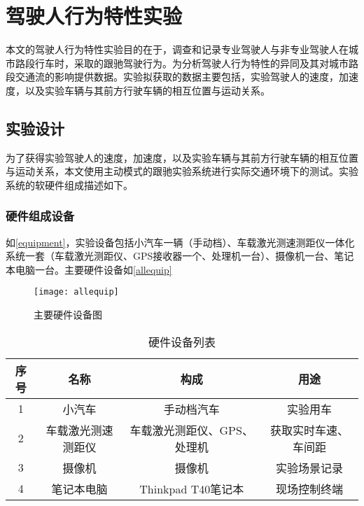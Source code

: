 \chapter{驾驶人行为特性实验}



本文的驾驶人行为特性实验目的在于，调查和记录专业驾驶人与非专业驾驶人在城市路段行车时，采取的跟驰驾驶行为。为分析驾驶人行为特性的异同及其对城市路段交通流的影响提供数据。实验拟获取的数据主要包括，实验驾驶人的速度，加速度，以及实验车辆与其前方行驶车辆的相互位置与运动关系。



\section{实验设计}
为了获得实验驾驶人的速度，加速度，以及实验车辆与其前方行驶车辆的相互位置与运动关系，本文使用主动模式的跟驰实验系统进行实际交通环境下的测试。实验系统的软硬件组成描述如下。
\subsection{硬件组成设备}
如\autoref{equipment}，实验设备包括小汽车一辆（手动档）、车载激光测速测距仪一体化系统一套（车载激光测距仪、GPS接收器一个、处理机一台）、摄像机一台、笔记本电脑一台。主要硬件设备如\autoref{allequip}

\begin{figure}[htpb]
\centering
\texttt{[image: allequip]}
\caption{主要硬件设备图}
\label{allequip}
\end{figure}

\begin{table}[htbp]
 \centering
 \caption{硬件设备列表}
 \begin{tabular}{cccc}
   \addlinespace
    \toprule
    序号 & 名称  & 构成 & 用途 \\
    \midrule
	1 & 小汽车 & 手动档汽车 & 实验用车 \\
	2 & 车载激光测速测距仪 & 车载激光测距仪、GPS、处理机 & 获取实时车速、车间距 \\
	3 & 摄像机 & 摄像机 & 实验场景记录 \\
	4 & 笔记本电脑 & Thinkpad T40笔记本 & 现场控制终端 \\
    \bottomrule
    \end{tabular}
  \label{equipment}
\end{table}



